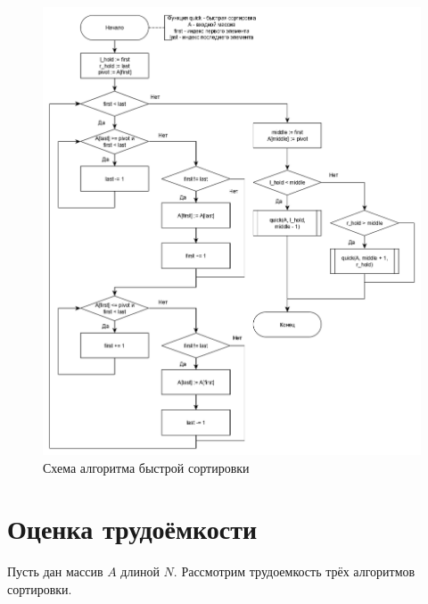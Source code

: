 \documentclass[12pt, a4paper]{report}
\begin{document}
	\begin{figure}[ht!]
		\centering
		\includegraphics[scale=0.55]{quick.png}
		\caption{Схема алгоритма быстрой сортировки}
		\label{pic:quick}
	\end{figure}

	\newpage

	\section{Оценка трудоёмкости}
	Пусть дан массив $A$ длиной $N$. Рассмотрим трудоемкость трёх алгоритмов сортировки.
	
\end{document}
